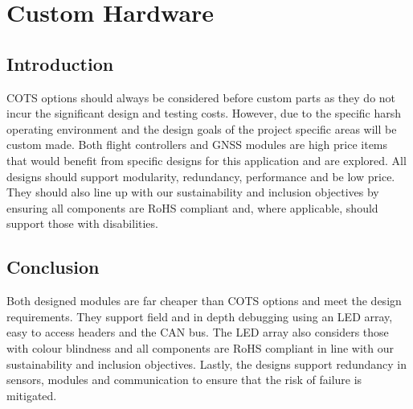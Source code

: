 \newpage
{}
\section{Custom Hardware} \label{section:Custom Hardware}
\subsection{Introduction}\label{sub_section:tgt_custom_hardware_intro}
\gls{COTS} options should always be considered before custom parts as they do not incur the significant design and testing costs. However, due to the specific harsh operating environment and the design goals of the project specific areas will be custom made. Both flight controllers and \gls{GNSS} modules are high price items that would benefit from specific designs for this application and are explored. All designs should support modularity, redundancy, performance and be low price. They should also line up with our sustainability and inclusion objectives by ensuring all components are \gls{RoHS} compliant and, where applicable, should support those with disabilities.





\subsection{Conclusion}
Both designed modules are far cheaper than \gls{COTS} options and meet the design requirements. They support field and in depth debugging using an \gls{LED} array, easy to access headers and the \gls{CAN} bus. The LED array also considers those with colour blindness and all components are \gls{RoHS} compliant in line with our sustainability and inclusion objectives. Lastly, the designs support redundancy in sensors, modules and communication to ensure that the risk of failure is mitigated.